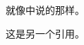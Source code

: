 \documentclass{ctexart}
\begin{document}
	就像\cite{石弘一2018机器学习综述}中说的那样。
	
	这是另一个引用。	\cite{hara3dcnns}
	
	\nocite{*} %
\end{document}
